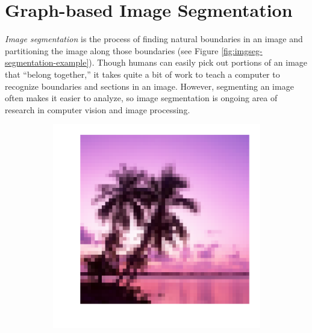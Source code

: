 \section*{Graph-based Image Segmentation} %

\emph{Image segmentation} is the process of finding natural boundaries in an image and partitioning the image along those boundaries (see Figure \ref{fig:imgseg-segmentation-example}).
Though humans can easily pick out portions of an image that ``belong together,'' it takes quite a bit of work to teach a computer to recognize boundaries and sections in an image.
However, segmenting an image often makes it easier to analyze, so image segmentation is ongoing area of research in computer vision and image processing.

\begin{figure}[H] %
    \centering
    \begin{subfigure}{.32\textwidth}
        \includegraphics[width=\textwidth]{figures/dream.pdf}
    \end{subfigure}
    \begin{subfigure}{.32\textwidth}

\end{subfigure}
\end{figure}
